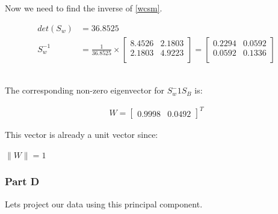 \documentclass[12pt]{article}
\begin{document}
Now we need to find the inverse of \ref{wcsm}.
\begin{center}
    
    \begin{align*}
        det(S_{w}) &= 36.8525\\
        S_{w}^{-1} &= \frac{1}{36.8525} \times \begin{bmatrix}
            8.4526 & 2.1803\\
            2.1803 & 4.9223\\
        \end{bmatrix}
        =
        \begin{bmatrix}
            0.2294 & 0.0592\\
            0.0592  & 0.1336\\
        \end{bmatrix}
    \end{align*}
    \\[0.1 in]
\end{center}

The corresponding non-zero eigenvector for $S_{w}^-1S_{B}$ is:
\begin{center}
    \begin{align}
        W = \begin{bmatrix}
            0.9998 & 0.0492
        \end{bmatrix}^{T} \label{eigen}
    \end{align}
\end{center}

This vector is already a unit vector since:
\begin{center}
    $
    \parallel W \parallel = 1
    $
\end{center}


\subsubsection{Part D}
Lets project our data using this principal component.
\end{document}
